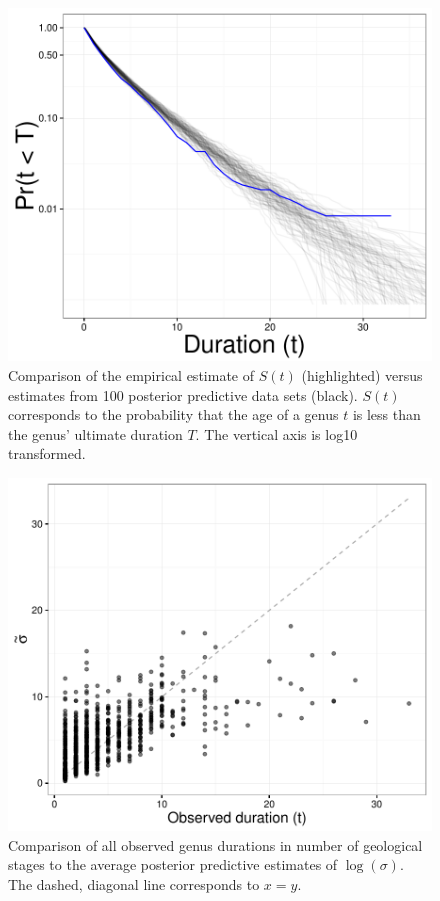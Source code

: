 \documentclass{article}
\begin{document}
\begin{figure}[ht]
  \centering
  \includegraphics[height = 0.5\textheight,width=\textwidth,keepaspectratio=true]{figure/survival_curves}
  \caption{Comparison of the empirical estimate of \(S(t)\) (highlighted) versus estimates from 100 posterior predictive data sets (black). \(S(t)\) corresponds to the probability that the age of a genus \(t\) is less than the genus' ultimate duration \(T\). The vertical axis is log10 transformed.}
  \label{fig:surv}
\end{figure}


\begin{figure}[ht]
  \centering
  \includegraphics[height = 0.5\textheight,width=\textwidth,keepaspectratio=true]{figure/shotgun}
  \caption{Comparison of all observed genus durations in number of geological stages to the average posterior predictive estimates of \(\log(\sigma)\). The dashed, diagonal line corresponds to \(x = y\).}
  \label{fig:shot}
\end{figure}
\end{document}
